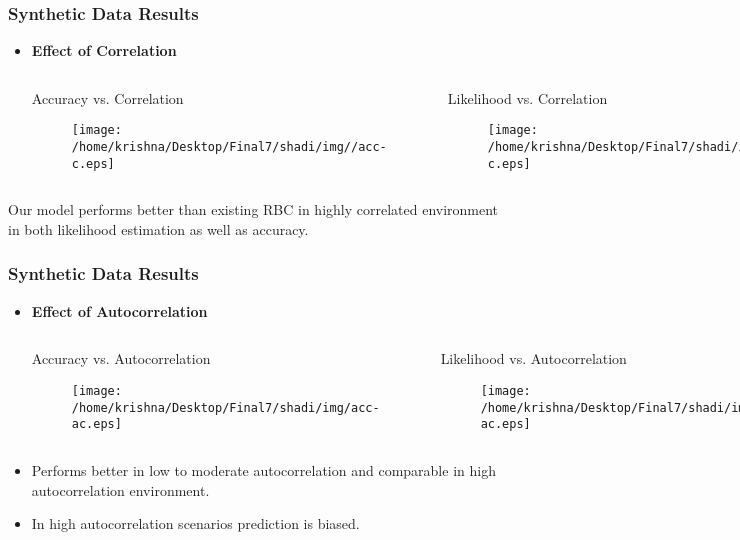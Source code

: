 \documentclass[10pt, blue,subsection=true, compress]{beamer}
\begin{document}
\begin{frame}\frametitle{Synthetic Data Results}
\begin{itemize}
\item \textbf{Effect of Correlation}
\begin{columns}[t]
\begin{block}{Accuracy vs. Correlation}
\begin{figure}[htbp]
\centering
\texttt{[image: /home/krishna/Desktop/Final7/shadi/img//acc-c.eps]}
\label{fig:4.1}
\end{figure}
\end{block}
\begin{block}{Likelihood vs. Correlation}
\begin{figure}[htbp]
\centering
\texttt{[image: /home/krishna/Desktop/Final7/shadi/img/lh-c.eps]}
\label{fig:4.2}
\end{figure}
\end{block}
\end{columns}
\end{itemize}
Our model performs better than existing RBC in highly correlated environment
in both likelihood estimation as well as accuracy.
\end{frame}

\begin{frame}\frametitle{Synthetic Data Results}
\begin{itemize}
\item \textbf{Effect of Autocorrelation}
\begin{columns}[t]

\begin{block}{Accuracy vs. Autocorrelation}
\begin{figure}[htbp]
\centering
\texttt{[image: /home/krishna/Desktop/Final7/shadi/img/acc-ac.eps]}
\end{figure}
\end{block}


\begin{block}{Likelihood vs. Autocorrelation}
\begin{figure}[htbp]
\centering
\texttt{[image: /home/krishna/Desktop/Final7/shadi/img/lh-ac.eps]}
\end{figure}

\end{block}
\end{columns}
\end{itemize}
\begin{itemize}
\item Performs better in low to moderate autocorrelation and comparable in high autocorrelation environment.
\item In high autocorrelation scenarios prediction is biased.
\end{itemize}
\end{frame}
\end{document}
